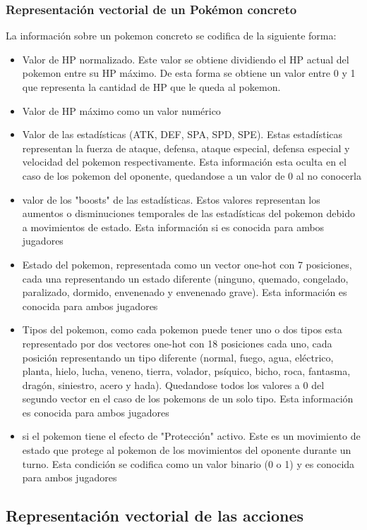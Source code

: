 \begin{itemize}
\subsubsection{Representación vectorial de un Pokémon concreto}
La información sobre un pokemon concreto se codifica de la siguiente forma:
\begin{itemize}
    \item Valor de HP normalizado. Este valor se obtiene dividiendo el HP actual del pokemon entre su HP máximo. De esta forma se obtiene un valor entre 0 y 1 que representa la cantidad de HP que le queda al pokemon.
    \item Valor de HP máximo como un valor numérico
    \item Valor de las estadísticas (ATK, DEF, SPA, SPD, SPE). Estas estadísticas representan la fuerza de ataque, defensa, ataque especial, defensa especial y velocidad del pokemon respectivamente. Esta información esta oculta en el caso de los pokemon del oponente, quedandose a un valor de 0 al no conocerla
    \item valor de los "boosts" de las estadísticas. Estos valores representan los aumentos o disminuciones temporales de las estadísticas del pokemon debido a movimientos de estado. Esta información si es conocida para ambos jugadores
    \item Estado del pokemon, representada como un vector one-hot con 7 posiciones, cada una representando un estado diferente (ninguno, quemado, congelado, paralizado, dormido, envenenado y envenenado grave). Esta información es conocida para ambos jugadores
    \item Tipos del pokemon, como cada pokemon puede tener uno o dos tipos esta representado por dos vectores one-hot con 18 posiciones cada uno, cada posición representando un tipo diferente (normal, fuego, agua, eléctrico, planta, hielo, lucha, veneno, tierra, volador, psíquico, bicho, roca, fantasma, dragón, siniestro, acero y hada). Quedandose todos los valores a 0 del segundo vector en el caso de los pokemons de un solo tipo. Esta información es conocida para ambos jugadores
    \item si el pokemon tiene el efecto de "Protección" activo. Este es un movimiento de estado que protege al pokemon de los movimientos del oponente durante un turno. Esta condición se codifica como un valor binario (0 o 1) y es conocida para ambos jugadores
\end{itemize}

\subsection{Representación vectorial de las acciones}


\end{itemize}
